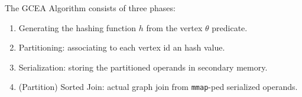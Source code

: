 \begin{lucido}
The GCEA Algorithm consists of three phases:
\begin{enumerate}[<+->]
	\item Generating the hashing function $h$ from the vertex $\theta$ predicate.
	\item \alert{Partitioning}: associating to each vertex id an hash value.
	\item \alert{Serialization}: storing the partitioned operands in secondary memory.
	\item \alert{(Partition) Sorted Join}: actual graph join from \texttt{mmap}-ped serialized operands.
\end{enumerate}
\end{lucido}

\begin{multilucido}[Serialization]
	\begin{sottolucido}
		\begin{center}
			\begin{columns}[T]
				\begin{column}{.7\textwidth}
					\centering
					\resizebox{.8\textwidth}{!}{}
					
				\end{column}
				\begin{column}{.3\textwidth}
					
				\end{column}
			\end{columns}
		\end{center}
	\end{sottolucido}

	\begin{sottolucido}
		\begin{center}
			\begin{columns}[T]
				\begin{column}{.7\textwidth}
					\centering
					\resizebox{.8\textwidth}{!}{}
					
				\end{column}
				\begin{column}{.3\textwidth}
					
				\end{column}
			\end{columns}
		\end{center}
	\end{sottolucido}
\end{multilucido}


